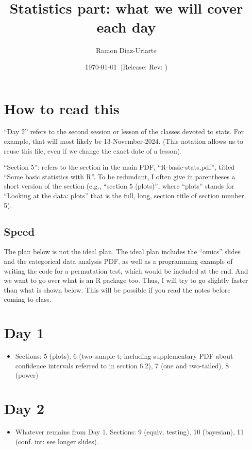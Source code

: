 \documentclass[12pt]{article}
\author{Ramon Diaz-Uriarte}
\date{\today}
\title{Statistics part: what we will cover each day}
\date{\gitAuthorDate\ {\footnotesize (Release\gitRels: Rev: \gitAbbrevHash)}}
\begin{document}
\maketitle
\section*{How to read this}
``Day 2'' refers to the second session or lesson of the classes devoted to stats. For example, that will most likely be 13-November-2024. (This notation allows us to reuse this file, even if we change the exact date of a lesson).


``Section 5'': refers to the section in the main PDF, ``R-basic-stats.pdf'', titled ``Some basic statistics with R''. To be redundant, I often give in parentheses a short version of the section (e.g., ``section 5 (plots)'', where ``plots'' stands for ``Looking at the data: plots'' that is the full, long, section title of section number 5).

\subsection*{Speed}
\label{sec:speed}

The plan below is not the ideal plan. The ideal plan includes the ``omics'' slides and the categorical data analysis PDF, as well as a programming example of writing the code for a permutation test, which would be included at the end. And we want to go over what is an R package too. Thus, I will try to go slightly faster than what is shown below. This will be possible if you read the notes before coming to class.


\section*{Day 1}
\label{sec:org21b08e0}
\begin{itemize}
\item Sections: 5 (plots), 6 (two-sample t; including supplementary PDF about confidence intervals referred to in section 6.2), 7 (one and two-tailed), 8 (power)
\end{itemize}
\section*{Day 2}
\label{sec:org5a4c730}
\begin{itemize}
\item Whatever remains from Day 1. Sections: 9 (equiv. testing), 10 (bayesian), 11 (conf. int: see longer slides).
\end{itemize}
\end{document}
